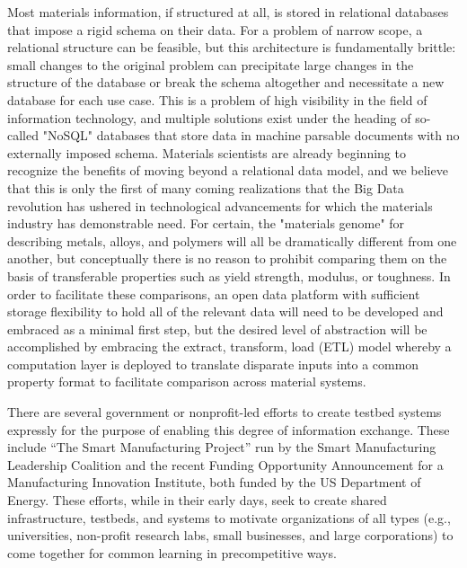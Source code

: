 Most materials information, if structured at all, is stored in relational databases that impose a rigid schema on their data. 
For a problem of narrow scope, a relational structure can be feasible, but this architecture is fundamentally brittle: small changes to the original problem can precipitate large changes in the structure of the database or break the schema altogether and necessitate a new database for each use case.
This is a problem of high visibility in the field of information technology, and multiple solutions exist under the heading of so-called "NoSQL" databases that store data in machine parsable documents with no externally imposed schema\cite{Han2011,Kaur2013}. Materials scientists are already beginning to recognize the benefits of moving beyond a relational data model\cite{Blair2014}, and we believe that this is only the first of many coming realizations that the Big Data revolution has ushered in technological advancements for which the materials industry has demonstrable need.
For certain, the "materials genome" for describing metals, alloys, and polymers will all be dramatically different from one another, but conceptually there is no reason to prohibit comparing them on the basis of transferable properties such as yield strength, modulus, or toughness. 
In order to facilitate these comparisons, an open data platform with sufficient storage flexibility to hold all of the relevant data will need to be developed and embraced as a minimal first step, but the desired level of abstraction will be accomplished by embracing the extract, transform, load (ETL) model whereby a computation layer is deployed to translate disparate inputs into a common property format to facilitate comparison across material systems.

There are several government or nonprofit-led efforts to create testbed systems expressly for the purpose of enabling this degree of information exchange. These include ``The Smart Manufacturing Project'' run by the Smart Manufacturing Leadership Coalition and the recent Funding Opportunity Announcement for a Manufacturing Innovation Institute, both funded by the US Department of Energy\cite{SmartManufacturingLeadershipCoalition2013,EERE-MII}. These efforts, while in their early days, seek to create shared infrastructure, testbeds, and systems to motivate organizations of all types (e.g., universities, non-profit research labs, small businesses, and large corporations) to come together for common learning in precompetitive ways. 
